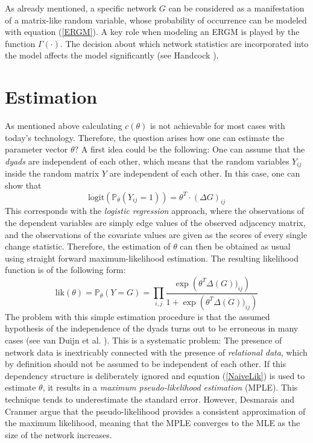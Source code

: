 \documentclass[10pt, conference, compsocconf]{IEEEtran}
\begin{document}
%
As already mentioned, a specific network $G$ can be considered as a manifestation of a matrix-like random variable, whose probability of occurrence can be modeled with equation (\ref{ERGM}).
A key role when modeling an ERGM is played by the function $\Gamma(\cdot)$. The decision about which network statistics are incorporated into the model affects the model significantly (see Handcock \cite{Handcock.2003}).


\section{Estimation}
\noindent As mentioned above calculating $c(\theta)$ is not achievable for most cases with today's technology. Therefore, the question arises how one can estimate the parameter vector $\theta$?
A first idea could be the following: One can assume that the \textit{dyads} are independent of each other, which means that the random variables $Y_{ij}$ inside the random matrix $Y$ are independent of each other. 
In this case, one can show that
%
\begin{equation*}
\text{logit}(\mathbb{P}_{\theta}(Y_{ij}=1))= \theta^T \cdot (\Delta G)_{ij}
\end{equation*}
This corresponds with the \textit{logistic regression} approach, where the observations of the dependent variables are simply edge values of the observed adjacency matrix, and the observations of the covariate values are given as the scores of every single change statistic. Therefore, the estimation of $\theta$ can then be obtained as usual using straight forward maximum-likelihood estimation. The resulting likelihood function is of the following form:
\begin{equation}
\text{lik}(\theta)= \mathbb{P}_{\theta}(Y=G)= \prod_{i,j} \dfrac{ \exp \left(\theta^T \Delta(G))_{ij} \right)}{1+\exp \left(\theta^T \Delta(G))_{ij} \right)}
\label{NaiveLik}
\end{equation}
The problem with this simple estimation procedure is that the assumed hypothesis of the independence of the dyads turns out to be erroneous in many cases (see van Duijn et al. \cite{vanDuijnetal2009}). This is a systematic problem: The presence of network data is inextricably connected with the presence of \textit{relational data}, which by definition should not be assumed to be independent of each other. If this dependency structure is deliberately ignored and equation (\ref{NaiveLik}) is used to estimate $\theta$, it results in a \textit{maximum pseudo-likelihood estimation} (MPLE). This technique tends to underestimate the standard error. However, Desmarais and Cranmer \cite{Desmarais.2012} argue that the pseudo-likelihood provides a consistent approximation of the maximum likelihood, meaning that the MPLE converges to the MLE as the size of the network increases.\\[0.3cm]
\end{document}
